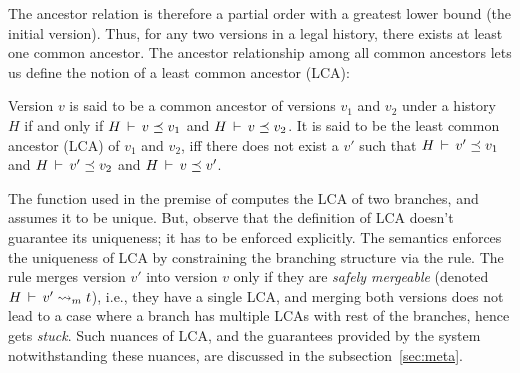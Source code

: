 The ancestor relation is therefore a partial order with a greatest
lower bound (the initial version).  Thus, for any two versions in a
legal history, there exists at least one common ancestor.  The ancestor
relationship among all common ancestors lets us define the notion of a
least common ancestor (LCA):

\begin{definition} 
Version $v$ is said to be a common ancestor of versions $v_1$ and
$v_2$ under a history $H$ if and only if $H\,\vdash\,v \preceq v_1$
and $H\,\vdash\,v \preceq v_2$. It is said to be the least common
ancestor (LCA) of $v_1$ and $v_2$, iff there does not exist a $v'$
such that $H\,\vdash\,v' \preceq v_1$ and $H\,\vdash\,v' \preceq v_2$
and $H\,\vdash\,v \preceq v'$.
\end{definition}

The function  used in the premise of 
computes the LCA of two branches, and assumes it to be unique.  But,
observe that the definition of LCA doesn't guarantee its uniqueness;
it has to be enforced explicitly.  The semantics enforces the
uniqueness of LCA by constraining the branching structure via the
 rule. The rule merges version $v'$ into
version $v$ only if they are \emph{safely mergeable} (denoted
$H\,\vdash\,v' \rightsquigarrow_m t$), i.e., they have a single LCA, and merging
both versions does not lead to a case where a branch has multiple LCAs
with rest of the branches, hence gets \emph{stuck}. Such nuances of
LCA, and the guarantees provided by the system notwithstanding these
nuances, are discussed in the subsection~\ref{sec:meta}. 




